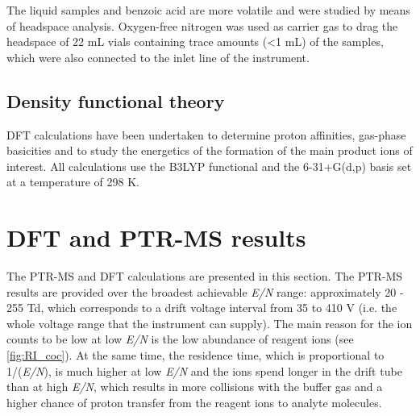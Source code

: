 The liquid samples and benzoic acid are more volatile and were studied by means of headspace analysis. Oxygen-free nitrogen was used as carrier gas to drag the headspace of 22 mL vials containing trace amounts (<1 mL) of the samples, which were also connected to the inlet line of the instrument. 

\subsection{Density functional theory}
DFT calculations have been undertaken to determine  proton affinities,  gas-phase basicities  and to study the energetics of the formation of the main product ions of interest. All calculations use the B3LYP functional and the 6-31+G(d,p) basis set at a temperature of 298 K.


\section{DFT and PTR-MS results}
The PTR-MS and DFT calculations are  presented in this section. The PTR-MS results are provided over the broadest achievable \textit{E/N} range: approximately 20 - 255 Td, which corresponds to a drift voltage interval from 35 to 410 V (i.e. the whole  voltage range that the instrument can supply). 
The main reason for the ion counts to be low at low \textit{E/N} is the low abundance of reagent ions (see \autoref{fig:RI_coc}). 
At the same time, the residence time, which is proportional to 1/(\textit{E/N}), is much higher at low \textit{E/N} and the ions spend longer in the drift tube than at high \textit{E/N}, which results in more collisions with the buffer gas and a higher chance of proton transfer from the reagent ions to analyte molecules. 
%
%



%
%
%
%


